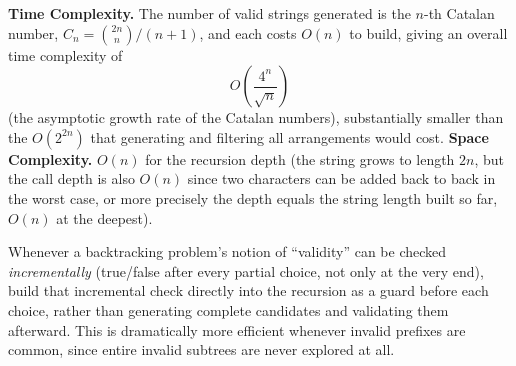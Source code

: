 \begin{complexitybox}
\textbf{Time Complexity.} The number of valid strings generated is the
$n$-th Catalan number, $C_n = \binom{2n}{n}/(n+1)$, and each costs
$O(n)$ to build, giving an overall time complexity of
\[
  O\!\left(\frac{4^n}{\sqrt{n}}\right)
\]
(the asymptotic growth rate of the Catalan numbers), substantially
smaller than the $O(2^{2n})$ that generating and filtering all
arrangements would cost.
\textbf{Space Complexity.} $O(n)$ for the recursion depth (the string
grows to length $2n$, but the call depth is also $O(n)$ since two
characters can be added back to back in the worst case, or more
precisely the depth equals the string length built so far, $O(n)$ at the
deepest).
\end{complexitybox}

\begin{takeawaybox}
Whenever a backtracking problem's notion of ``validity'' can be checked
\emph{incrementally} (true/false after every partial choice, not only at
the very end), build that incremental check directly into the recursion
as a guard before each choice, rather than generating complete candidates
and validating them afterward. This is dramatically more efficient
whenever invalid prefixes are common, since entire invalid subtrees are
never explored at all.
\end{takeawaybox}
